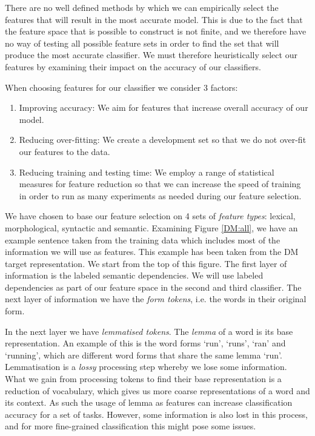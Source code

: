 There are no well defined methods by which we can empirically select the features that will result in the most accurate model. This is due to the fact that the feature space that is possible to construct is not finite, and we therefore have no way of testing all possible feature sets in order to find the set that will produce the most accurate classifier. We must therefore heuristically select our features by examining their impact on the accuracy of our classifiers.

When choosing features for our classifier we consider 3 factors:

\begin{enumerate}
    \item Improving accuracy: We aim for features that increase overall accuracy of our model.
    \item Reducing over-fitting: We create a development set so that we do not over-fit our features to the data.
    \item Reducing training and testing time: We employ a range of statistical measures for feature reduction so that we can increase the speed of training in order to run as many experiments as needed during our feature selection.
\end{enumerate}

We have chosen to base our feature selection on 4 sets of \textit{feature types}: lexical, morphological, syntactic and semantic. Examining Figure \ref{DM:all}, we have an example sentence taken from the training data which includes most of the information we will use as features. This example has been taken from the DM target representation. We start from the top of this figure. The first layer of information is the labeled semantic dependencies. We will use labeled dependencies as part of our feature space in the second and third classifier. The next layer of information we have the \textit{form tokens}, i.e. the words in their original form. 

In the next layer we have \textit{lemmatised tokens}. The \textit{lemma} of a word is its base representation. An example of this is the word forms `run', `runs', `ran' and `running', which are different word forms that share the same lemma `run'. Lemmatisation is a \textit{lossy} processing step whereby we lose some information. What we gain from processing tokens to find their base representation is a reduction of vocabulary, which gives us more coarse representations of a word and its context. As such the usage of lemma as features can increase classification accuracy for a set of tasks. However, some information is also lost in this process, and for more fine-grained classification this might pose some issues. 

